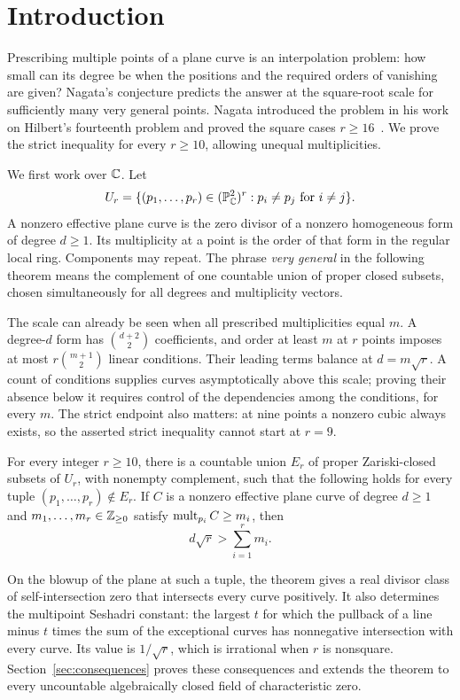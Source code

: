 \section{Introduction}\label{sec:introduction}

Prescribing multiple points of a plane curve is an interpolation problem:
how small can its degree be when the positions and the required orders of
vanishing are given? Nagata's conjecture predicts the answer at the
square-root scale for sufficiently many very general points. Nagata
introduced the problem in his work on Hilbert's fourteenth problem and
proved the square cases $r\ge16$~\cite{Nagata1959,Nagata1965}. We prove
the strict inequality for every $r\ge10$, allowing unequal multiplicities.

We first work over $\mathbb C$. Let
\[
 U_r=\{(p_1,\ldots,p_r)\in(\mathbb P^2_\mathbb C)^r:p_i\ne p_j\text{ for }i\ne j\}.
\]
A nonzero effective plane curve is the zero divisor of a nonzero
homogeneous form of degree $d\ge1$. Its multiplicity at a point is the
order of that form in the regular local ring. Components may repeat.
The phrase \emph{very general} in the following theorem means the
complement of one countable union of proper closed subsets, chosen
simultaneously for all degrees and multiplicity vectors.

The scale can already be seen when all prescribed multiplicities equal
$m$. A degree-$d$ form has $\binom{d+2}{2}$ coefficients, and order at
least $m$ at $r$ points imposes at most $r\binom{m+1}{2}$ linear
conditions. Their leading terms balance at $d=m\sqrt r$. A count of
conditions supplies curves asymptotically above this scale; proving their
absence below it requires control of the dependencies among the conditions, for every
$m$. The strict endpoint also matters: at nine points a nonzero cubic
always exists, so the asserted strict inequality cannot start at $r=9$.

\begin{theorem}\label{thm:main}
For every integer $r\ge10$, there is a countable union $E_r$ of proper
Zariski-closed subsets of $U_r$, with nonempty complement, such that the
following holds for every tuple $(p_1,\ldots,p_r)\notin E_r$.
If $C$ is a nonzero effective plane curve of degree $d\ge1$ and
$m_1,\ldots,m_r\in\mathbb Z_{\ge0}$ satisfy $\operatorname{mult}_{p_i}C\ge m_i$, then
\[
 d\sqrt r>\sum_{i=1}^r m_i.
\]
\end{theorem}

On the blowup of the plane at such a tuple, the theorem gives a real divisor
class of self-intersection zero that intersects every curve positively.
It also determines the multipoint Seshadri constant: the largest $t$ for
which the pullback of a line minus $t$ times the sum of the exceptional
curves has nonnegative intersection with every curve. Its value is
$1/\sqrt r$, which is irrational when $r$ is nonsquare.
Section~\ref{sec:consequences} proves these consequences
and extends the theorem to every uncountable algebraically closed field
of characteristic zero.

